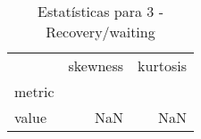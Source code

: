 \begin{table}[htbp]
\caption{Estatísticas para 3 - Recovery/waiting}
\label{tab:3_-_recovery_waiting_skewkurt}
\begin{tabular}{lrr}
\toprule
 & skewness & kurtosis \\
metric &  &  \\
\midrule
value & NaN & NaN \\
\bottomrule
\end{tabular}
\end{table}
